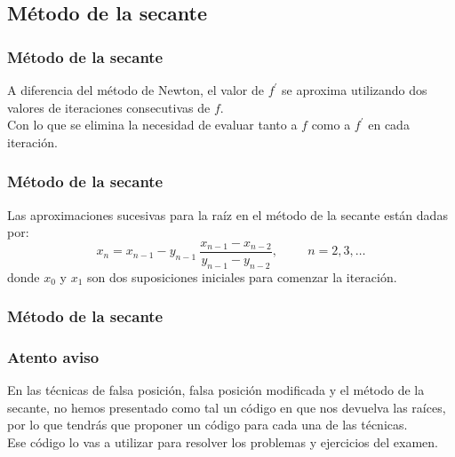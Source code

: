 \subsection{Método de la secante}
\begin{frame}
\frametitle{Método de la secante}
A diferencia del método de Newton, el valor de $f^{\prime}$ se aproxima utilizando dos valores de iteraciones consecutivas de $f$.
\\
\bigskip
Con lo que se elimina la necesidad de evaluar tanto a $f$ como a $f^{\prime}$ en cada iteración.
\end{frame}
\begin{frame}
\frametitle{Método de la secante}
Las aproximaciones sucesivas para la raíz en el método de la secante están dadas por:
\[ x_{n} = x_{n - 1} - y_{n - 1} \: \dfrac{x_{n - 1} - x_{n - 2}}{y_{n - 1}- y_{n - 2}}, \hspace{1cm} n = 2,3,\ldots \]
donde $x_{0}$ y $x_{1}$ son dos suposiciones iniciales para comenzar la iteración.
\end{frame}
\begin{frame}[fragile]
\frametitle{Método de la secante}
\begin{figure}
	\centering
	
\end{figure}
\end{frame}
\begin{frame}
\frametitle{Atento aviso}
En las técnicas de falsa posición, falsa posición modificada y el método de la secante, no hemos presentado como tal un código en \python{} que nos devuelva las raíces, por lo que tendrás que proponer un código para cada una de las técnicas.
\\
\medskip
Ese código lo vas a utilizar para resolver los problemas y ejercicios del examen.
\end{frame}
